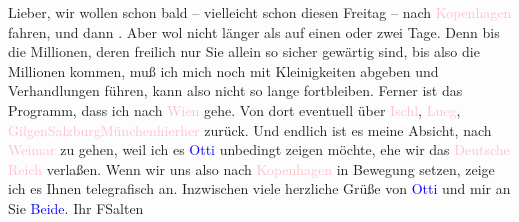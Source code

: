 \pstart
           Lieber, wir wollen schon bald – vielleicht schon diesen Freitag – nach \textcolor{pink}{Kopenhagen}{}\ledrightnote{\textcolor{pink}{Kopenhagen}} fahren, und dann \label{K_L03431-1v}\label{K_L03431-1h}. Aber wol nicht länger als auf einen oder zwei Tage. Denn bis die Millionen,
               deren freilich nur Sie allein so sicher gewärtig sind, bis also die Millionen kommen,
               muß ich mich noch mit Kleinigkeiten abgeben und Verhandlungen führen, kann also nicht
               so lange fortbleiben. Ferner ist das Programm, dass ich nach \textcolor{pink}{Wien}{}\ledrightnote{\textcolor{pink}{Wien}} gehe. Von dort eventuell über \textcolor{pink}{Ischl}{}\ledrightnote{\textcolor{pink}{Bad Ischl}}, \textcolor{pink}{Lueg}{}\ledrightnote{\textcolor{pink}{Lueg am Wolfgangsee}}, \textcolor{pink}{Gilgen}{}\ledrightnote{\textcolor{pink}{St. Gilgen}}{ }\textcolor{pink}{Salzburg}{}\ledrightnote{\textcolor{pink}{Salzburg}}{ }\textcolor{pink}{München}{}\ledrightnote{\textcolor{pink}{München}}{ }\textcolor{pink}{hierher}{}\ledrightnote{{$\rightarrow$}\textcolor{pink}{Bansin}} zurück. Und endlich
               ist es meine Absicht, nach \textcolor{pink}{Weimar}{}\ledrightnote{\textcolor{pink}{Weimar}} zu gehen, weil
               ich es \textcolor{blue}{Otti}{}\ledrightnote{\textcolor{blue}{Ottilie Salten}} unbedingt zeigen möchte, ehe wir
               das \textcolor{pink}{Deutsche Reich}{}\ledrightnote{\textcolor{pink}{Deutschland}} verlaßen. Wenn wir uns also
               nach \textcolor{pink}{Kopenhagen}{}\ledrightnote{\textcolor{pink}{Kopenhagen}} in Bewegung setzen, zeige ich
               es Ihnen telegrafisch an. Inzwischen viele herzliche Grüße von \textcolor{blue}{Otti}{}\ledrightnote{\textcolor{blue}{Ottilie Salten}} und mir an Sie \textcolor{blue}{Beide}{}\ledrightnote{{$\rightarrow$}\textcolor{blue}{Olga Schnitzler}}.\pend
           \pstart Ihr \spacefill\mbox{FSalten}\pend{}\endnumbering{}  
      